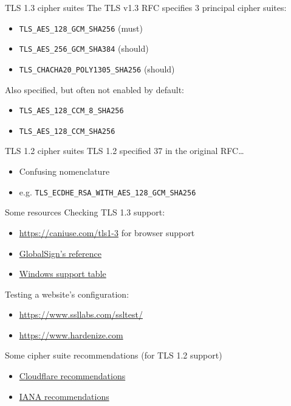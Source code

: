 \begin{frame}{TLS 1.3 cipher suites}
  The TLS v1.3 RFC specifies 3 principal cipher suites:
  \pause
  \begin{itemize}
    \item {\small\texttt{TLS\_AES\_128\_GCM\_SHA256}} (must)
    \item {\small\texttt{TLS\_AES\_256\_GCM\_SHA384}} (should)
    \item {\small\texttt{TLS\_CHACHA20\_POLY1305\_SHA256}} (should)
  \end{itemize}

  \vspace*{1em}

  \pause
  Also specified, but often not enabled by default:
  \begin{itemize}
    \item {\small\texttt{TLS\_AES\_128\_CCM\_8\_SHA256}}
    \item {\small\texttt{TLS\_AES\_128\_CCM\_SHA256}}
  \end{itemize}
\end{frame}

\begin{frame}{TLS 1.2 cipher suites}
  TLS 1.2 specified 37 in the original RFC\dots
  \begin{itemize}
    \item Confusing nomenclature
    \item e.g. {\small\texttt{TLS\_ECDHE\_RSA\_WITH\_AES\_128\_GCM\_SHA256}}
  \end{itemize}
\end{frame}

\begin{frame}{Some resources}
  Checking TLS 1.3 support:
  \begin{itemize}
    \item {\small\url{https://caniuse.com/tls1-3}} for browser support
    \item \href{https://support.globalsign.com/ssl/general-ssl/tls-protocol-compatibility}{GlobalSign's reference}
    \item \href{https://learn.microsoft.com/en-us/windows/win32/secauthn/protocols-in-tls-ssl--schannel-ssp-}{Windows support table}
  \end{itemize}

  \pause
  Testing a website's configuration:
  \begin{itemize}
    \item {\small\url{https://www.ssllabs.com/ssltest/}}
    \item {\small\url{https://www.hardenize.com}}
  \end{itemize}

  \pause
  Some cipher suite recommendations (for TLS 1.2 support)
  \begin{itemize}
    \item \href{https://developers.cloudflare.com/ssl/reference/cipher-suites/recommendations/}{Cloudflare recommendations}
    \item \href{https://www.iana.org/assignments/tls-parameters/tls-parameters.xhtml?ref=hackernoon.com\#tls-parameters-4}{IANA recommendations}
  \end{itemize}
\end{frame}

